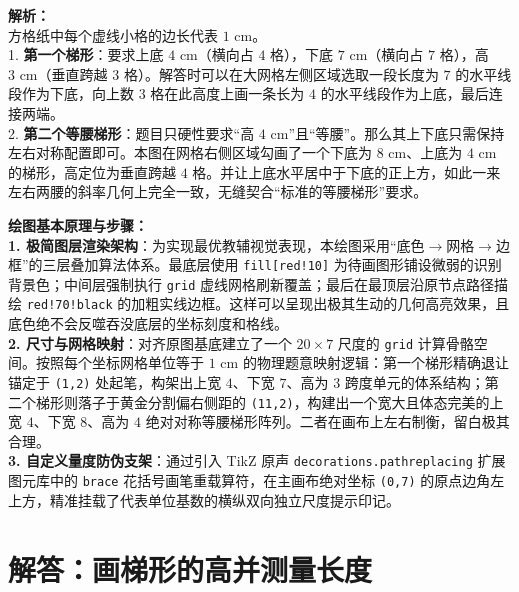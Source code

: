 {\small\color{gray}
\textbf{解析：}\\
方格纸中每个虚线小格的边长代表 $1\text{ cm}$。\\
1. \textbf{第一个梯形}：要求上底 $4\text{ cm}$（横向占 $4$ 格），下底 $7\text{ cm}$（横向占 $7$ 格），高 $3\text{ cm}$（垂直跨越 $3$ 格）。解答时可以在大网格左侧区域选取一段长度为 $7$ 的水平线段作为下底，向上数 $3$ 格在此高度上画一条长为 $4$ 的水平线段作为上底，最后连接两端。\\
2. \textbf{第二个等腰梯形}：题目只硬性要求“高 $4\text{ cm}$”且“等腰”。那么其上下底只需保持左右对称配置即可。本图在网格右侧区域勾画了一个下底为 $8\text{ cm}$、上底为 $4\text{ cm}$ 的梯形，高定位为垂直跨越 $4$ 格。并让上底水平居中于下底的正上方，如此一来左右两腰的斜率几何上完全一致，无缝契合“标准的等腰梯形”要求。
}

\vspace{0.6cm}

{\small\color{blue!70!black}
\textbf{绘图基本原理与步骤：}\\
\textbf{1. 极简图层渲染架构}：为实现最优教辅视觉表现，本绘图采用“底色$\to$网格$\to$边框”的三层叠加算法体系。最底层使用 \texttt{fill[red!10]} 为待画图形铺设微弱的识别背景色；中间层强制执行 \texttt{grid} 虚线网格刷新覆盖；最后在最顶层沿原节点路径描绘 \texttt{red!70!black} 的加粗实线边框。这样可以呈现出极其生动的几何高亮效果，且底色绝不会反噬吞没底层的坐标刻度和格线。\\
\textbf{2. 尺寸与网格映射}：对齐原图基底建立了一个 $20 \times 7$ 尺度的 \texttt{grid} 计算骨骼空间。按照每个坐标网格单位等于 $1\text{ cm}$ 的物理题意映射逻辑：第一个梯形精确退让锚定于 \texttt{(1,2)} 处起笔，构架出上宽 $4$、下宽 $7$、高为 $3$ 跨度单元的体系结构；第二个梯形则落子于黄金分割偏右侧距的 \texttt{(11,2)}，构建出一个宽大且体态完美的上宽 $4$、下宽 $8$、高为 $4$ 绝对对称等腰梯形阵列。二者在画布上左右制衡，留白极其合理。\\
\textbf{3. 自定义量度防伪支架}：通过引入 TikZ 原声 \texttt{decorations.pathreplacing} 扩展图元库中的 \texttt{brace} 花括号画笔重载算符，在主画布绝对坐标 \texttt{(0,7)} 的原点边角左上方，精准挂载了代表单位基数的横纵双向独立尺度提示印记。
}


\newpage




\newpage

\section{解答：画梯形的高并测量长度}

\vspace{0.4cm}

